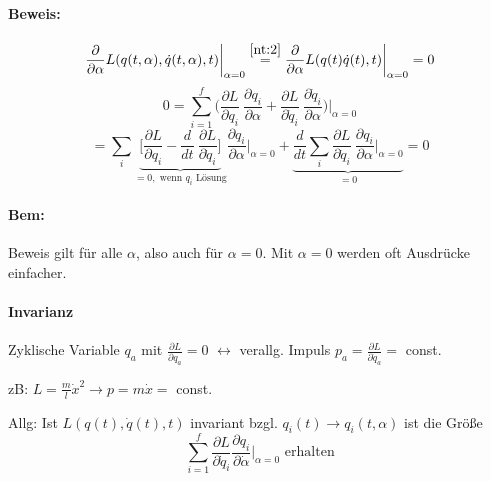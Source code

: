 \documentclass[titlepage,12pt,a4paper,ngerman]{report}
\newcommand{\tx}[1]{\textrm{#1}}
\newcommand{\summ}[2]{\sum_{#1}^{#2}}
\begin{document}
\paragraph{Beweis:}
$$\frac{\partial}{\partial \alpha}L(q(t,\alpha), \dot q(t, \alpha),t)\bigg|_{\alpha=0} \buildrel \ref{nt:2} \over = \frac{\partial}{\partial \alpha}L(q(t)\dot q(t),t)\bigg|_{\alpha=0} = 0$$
$$0 = \summ{i=1}{f}\bigg(\frac{\partial L}{\partial q_i}\ \frac{\partial q_i}{\partial \alpha} + \frac{\partial L}{\partial \dot q_i}\ \frac{\partial \dot q_i}{\partial \alpha}\bigg) \bigg|_{\alpha=0}$$
$$= \sum_i \underbrace{\bigg[\frac{\partial L}{\partial q_i} - \frac{d}{dt} \ \frac{\partial L}{\partial \dot q_i} \bigg]}_{= 0, \tx{ wenn $q_i$ Lösung}} \frac{\partial q_i}{\partial \alpha}\bigg|_{\alpha=0} + \underbrace{\frac{d}{dt} \sum_i \frac{\partial L}{\partial \dot q_i}\ \frac{\partial q_i}{\partial \alpha}\bigg|_{\alpha=0}}_{= 0} = 0$$
\paragraph{Bem:} Beweis gilt für alle $\alpha$, also auch für $\alpha = 0$. Mit $\alpha = 0$ werden oft Ausdrücke einfacher.


\paragraph{Invarianz}
\begin{trivlist}
	\item Zyklische Variable $q_a$ mit $\frac{\partial L}{\partial q_a}= 0 $ $\leftrightarrow$ verallg. Impuls $p_a = \frac{\partial L}{\partial \dot q_a} = $ const.
	\item zB: $L = \frac{m}{l}\dot x^2 \rightarrow p = m \dot x = $ const.
	\item Allg: Ist $L(q(t), \dot q(t), t)$ invariant bzgl. $q_i (t) \rightarrow q_i (t, \alpha)$ ist die Größe $$\summ{i = 1}{f} \frac{\partial L}{\partial \dot q_i} \frac{\partial q_i}{\partial \dot \alpha} \bigg|_{\alpha = 0} \tx{ erhalten}$$
\end{trivlist}
\end{document}
